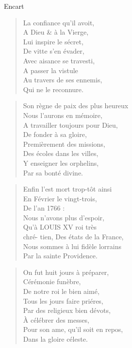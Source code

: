 \begin{diary}{Encart}{}
        \begin{verse}La confiance qu'il avoit,\\A Dieu & à la Vierge,\\Lui inspire le sécret,\\De vitte s'en évader,\\Avec aisance se travesti,\\A passer la vistule\\Au travers de ses ennemis,\\Qui ne le reconnure.\\\end{verse}
        \bigskip
        
        \begin{verse}Son règne de paix des plus heureux\\Nous l'aurons en mémoire,\\A travailler toujours pour Dieu,\\De fonder à sa gloire,\\Premièrement des missions,\\Des écoles dans les villes,\\Y enseigner les orphelins,\\Par sa bonté divine.\\\end{verse}
        \bigskip
        
        \begin{verse}Enfin l’est mort trop-tôt ainsi\\En Février le vingt-trois,\\De l'an 1766 :\\Nous n'avons plus d'espoir,\\Qu’à LOUIS XV roi très \\chré-
                                    tien, Des états de
                                    la France,\\Nous sommes à lui fidèle lorrains\\Par la sainte Providence.\\\end{verse}
        \bigskip
        
        \begin{verse}On fut huit jours à préparer,\\Cérémonie funèbre,\\De notre roi le bien
                                 aimé,\\Tous les jours faire priéres,\\Par des religieux bien dévots,\\À célébrer des messes,\\Pour son ame, qu'il soit en repos,\\Dans la gloire céleste.\\\end{verse}
        \bigskip
        

\end{diary}
